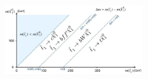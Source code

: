 \documentclass[compress, serif]{beamer}
\newcommand{\njet}{\ensuremath{n_{\text{jet}}}\xspace}
\newcommand{\nb}{\ensuremath{n_{\text{b}}}\xspace}
\newcommand{\st}{\ensuremath{\tilde{\rm t}}\xspace}
\begin{document}
{\begin{figure}[h!]
\begin{center}
  \end{center}
\end{figure}
\begin{center}
\includegraphics[width=0.45\textwidth,]{../figures/mstop_mLSP_plane.jpg}
\end{center}
}
\end{document}
